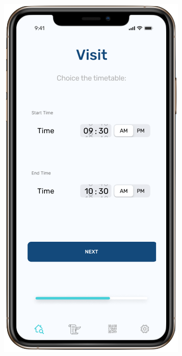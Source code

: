 \begin{figure}[H]
\begin{center}
{            \includegraphics[scale=0.35]{images/mockup/visit2.png}
        }%
\end{center}
\end{figure}

